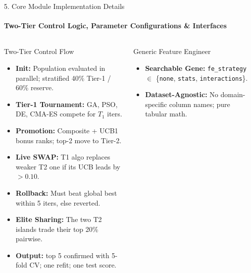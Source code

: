 \documentclass[aspectratio=169, 11pt]{beamer}
\begin{document}
\begin{frame}{5. Core Module Implementation Details}
    \framesubtitle{Two-Tier Control Logic, Parameter Configurations \& Interfaces}
    \begin{columns}[T]
        \begin{block}{Two-Tier Control Flow}
            \scriptsize
            \begin{itemize}
                \setlength{\itemsep}{1pt}
                \item \textbf{Init:} Population evaluated in parallel; stratified 40\% Tier-1 / 60\% reserve.
                \item \textbf{Tier-1 Tournament:} GA, PSO, DE, CMA-ES compete for $T_1$ iters.
                \item \textbf{Promotion:} Composite + UCB1 bonus ranks; top-2 move to Tier-2.
                \item \textbf{Live SWAP:} T1 algo replaces weaker T2 one if its UCB leads by $>0.10$.
                \item \textbf{Rollback:} Must beat global best within 5 iters, else reverted.
                \item \textbf{Elite Sharing:} The two T2 islands trade their top 20\% pairwise.
                \item \textbf{Output:} top 5 confirmed with 5-fold CV; one refit; one test score.
            \end{itemize}
        \end{block}

        \begin{block}{Generic Feature Engineer}
            \scriptsize
            \begin{itemize}
                \setlength{\itemsep}{1pt}
                \item \textbf{Searchable Gene:} \texttt{fe\_strategy} $\in$ \{\texttt{none}, \texttt{stats}, \texttt{interactions}\}.
                \item \textbf{Dataset-Agnostic:} No domain-specific column names; pure tabular math.
            \end{itemize}
        \end{block}


\end{columns}
\end{frame}
\end{document}
